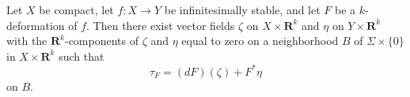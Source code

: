 Let $X$ be compact, let $f \colon X \to Y$ be infinitesimally stable, and let
$F$ be a $k$-deformation of $f$. Then there exist vector fields $\zeta$
on $X \times \mathbf{R}^k$ and $\eta$ on $Y \times \mathbf{R}^k$ with
the $\mathbf{R}^k$-components of $\zeta$ and $\eta$ equal to zero on a
neighborhood $B$ of $\Sigma \times \{0\}$ in $X \times \mathbf{R}^k$ such that
$$\tau_F = (dF)(\zeta) + F^*\eta$$
on $B$.
